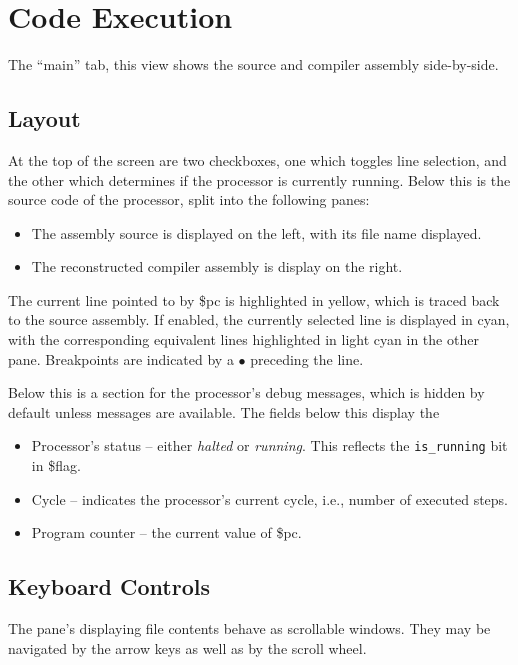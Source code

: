 \documentclass[10pt]{article}
\begin{document}
    \section{Code Execution}

    The ``main'' tab, this view shows the source and compiler assembly side-by-side.

    \subsection{Layout}

    At the top of the screen are two checkboxes, one which toggles line selection, and the other which determines if the processor is currently running.
    Below this is the source code of the processor, split into the following panes:
    \begin{itemize}
        \item The assembly source is displayed on the left, with its file name displayed.
        \item The reconstructed compiler assembly is display on the right.
    \end{itemize}
    The current line pointed to by \$pc is highlighted in yellow, which is traced back to the source assembly.
    If enabled, the currently selected line is displayed in cyan, with the corresponding equivalent lines highlighted in light cyan in the other pane.
    Breakpoints are indicated by a {\color{red} \(\bullet\)} preceding the line.

    Below this is a section for the processor's debug messages, which is hidden by default unless messages are available.
    The fields below this display the
    \begin{itemize}
        \item Processor's status -- either \textit{halted} or \textit{running}.
        This reflects the \texttt{is\_running} bit in \$flag.
        \item Cycle -- indicates the processor's current cycle, i.e., number of executed steps.
        \item Program counter -- the current value of \$pc.
    \end{itemize}

    \subsection{Keyboard Controls}

    The pane's displaying file contents behave as scrollable windows.
    They may be navigated by the arrow keys as well as by the scroll wheel.
\end{document}
